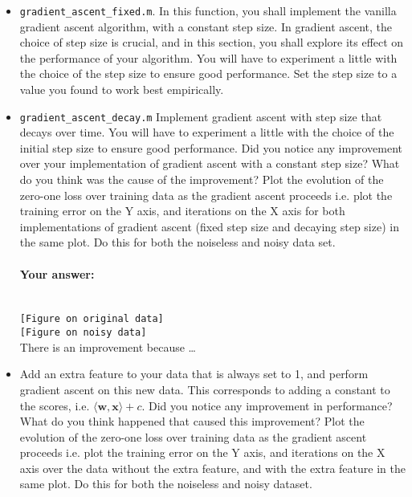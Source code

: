 \begin{itemize}
\item {\tt gradient\_ascent\_fixed.m}. In this function, you shall implement the vanilla gradient ascent algorithm, with a constant step size. In gradient ascent, the choice of step size is crucial, and in this section, you shall explore its effect on the performance of your algorithm. You will have to experiment a little with the choice of the step size to ensure good performance. Set the step size to a value you found to work best empirically. 

\item {\tt gradient\_ascent\_decay.m} Implement gradient ascent with step size that decays over time. You will have to experiment a little with the choice of the initial step size to ensure good performance. Did you notice any improvement over your implementation of gradient ascent with a constant step size? What do you think was the cause of the improvement? Plot the evolution of the zero-one loss over training data as the gradient ascent proceeds i.e. plot the training error on the Y axis, and iterations on the X axis for both implementations of gradient ascent (fixed step size and decaying step size) in the same plot. Do this for both the noiseless and noisy data set.

\paragraph{Your answer:}
 ~\\
 
 {\tt  [Figure on original data]}
 \\    
 
 {\tt [Figure on noisy data]}
 \\
  
  There is an improvement because \ldots  
  \\


\item Add an extra feature to your data that is always set to 1, and perform gradient ascent on this new data. This corresponds to adding a constant to the scores, i.e. $\langle \textbf{w},\textbf{x}\rangle + c$. Did you notice any improvement in performance? What do you think happened that caused this improvement? Plot the evolution of the zero-one loss over training data as the gradient ascent proceeds i.e. plot the training error on the Y axis, and iterations on the X axis over the data without the extra feature, and with the extra feature in the same plot. Do this for both the noiseless and noisy dataset.


\end{itemize}
